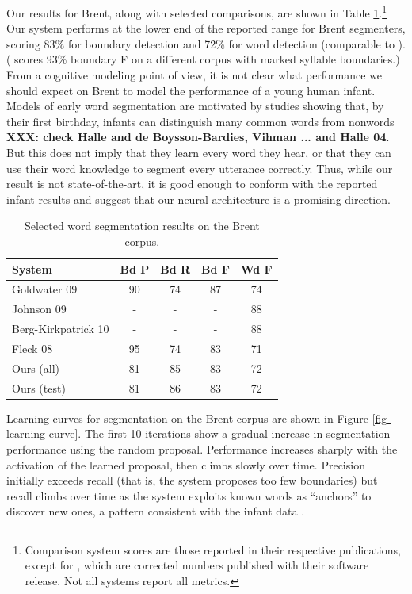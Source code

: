 \documentclass[11pt,letterpaper]{article}
\newcommand{\xxx}[1]{\textbf{\color{red}XXX: #1}}
\begin{document}
Our results for Brent, along with selected comparisons, are shown in
Table \ref{tab-results}.\footnote{Comparison system scores are those
  reported in their respective publications, except for
  , which are corrected numbers published with
  their software release. Not all systems report all metrics.} Our
system performs at the lower end of the reported range for Brent
segmenters, scoring 83\% for boundary detection and 72\% for word
detection (comparable to \cite{Fleck08}). ( scores
93\% boundary F on a different corpus with marked syllable
boundaries.) From a cognitive modeling point of view, it is not clear
what performance we should expect on Brent to model the performance of
a young human infant. Models of early word segmentation are motivated
by studies showing that, by their first birthday, infants can
distinguish many common words from nonwords \cite{Swingley05}
\xxx{check Halle and de Boysson-Bardies, Vihman ... and Halle 04}. But
this does not imply that they learn every word they hear, or that they
can use their word knowledge to segment every utterance
correctly. Thus, while our result is not state-of-the-art, it is good
enough to conform with the reported infant results and suggest that
our neural architecture is a promising direction.


\begin{table}
\begin{tabular}{p{2.1cm}cccc}
System & Bd P & Bd R & Bd F & Wd F\\
\hline
Goldwater 09       & 90 & 74 & 87 & 74\\ 
Johnson 09         & - & - & - & 88\\
Berg-Kirkpatrick 10 & - & - & - & 88\\
Fleck 08           & 95 & 74 & 83 & 71\\
\hline
Ours (all) & 81 & 85 & 83 & 72\\
Ours (test) & 81 & 86 & 83 & 72\\
\end{tabular}
\caption{Selected word segmentation results on the Brent corpus.}
\label{tab-results}
\end{table}

Learning curves for segmentation on the Brent corpus are shown in
Figure \ref{fig-learning-curve}. The first 10 iterations show a
gradual increase in segmentation performance using the random
proposal. Performance increases sharply with the activation of
the learned proposal, then climbs slowly over time. Precision
initially exceeds recall (that is, the system proposes too few
boundaries) but recall climbs over time as the system exploits known
words as ``anchors'' to discover new ones, a pattern consistent with
the infant data \cite{Bortfeld05}.
\end{document}
